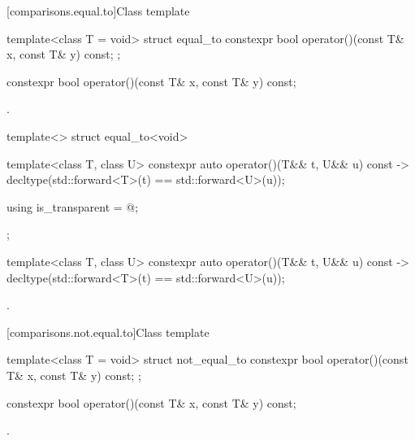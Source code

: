 [comparisons.equal.to]{Class template }

%
\begin{itemdecl}
template<class T = void> struct equal_to {
  constexpr bool operator()(const T& x, const T& y) const;
};
\end{itemdecl}

%
\begin{itemdecl}
constexpr bool operator()(const T& x, const T& y) const;
\end{itemdecl}

\begin{itemdescr}
\pnum
\returns
{}.
\end{itemdescr}

%
\begin{itemdecl}
template<> struct equal_to<void> {
  template<class T, class U> constexpr auto operator()(T&& t, U&& u) const
    -> decltype(std::forward<T>(t) == std::forward<U>(u));

  using is_transparent = @\unspec@;
};
\end{itemdecl}

%
\begin{itemdecl}
template<class T, class U> constexpr auto operator()(T&& t, U&& u) const
    -> decltype(std::forward<T>(t) == std::forward<U>(u));
\end{itemdecl}

\begin{itemdescr}
\pnum
\returns
{}.
\end{itemdescr}

[comparisons.not.equal.to]{Class template }

%
\begin{itemdecl}
template<class T = void> struct not_equal_to {
  constexpr bool operator()(const T& x, const T& y) const;
};
\end{itemdecl}

%
\begin{itemdecl}
constexpr bool operator()(const T& x, const T& y) const;
\end{itemdecl}

\begin{itemdescr}
\pnum
\returns
{}.
\end{itemdescr}


